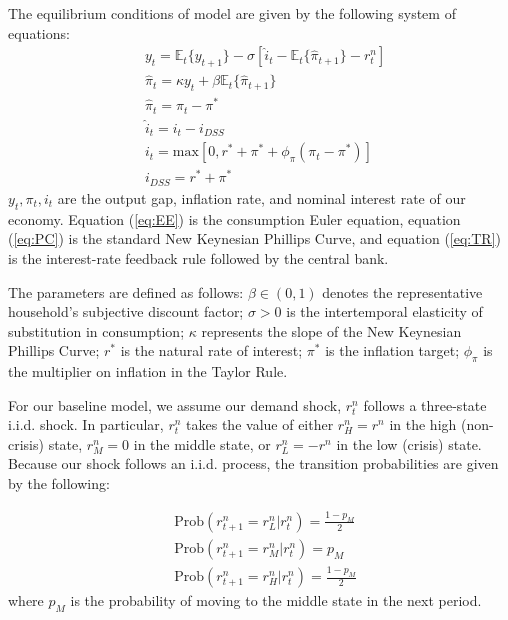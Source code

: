 \documentclass[11pt]{article}
\begin{document}
	The equilibrium conditions of model are given by the following system of equations: 
	\begin{align}
		& y_{t} = \mathbb{E}_t\{y_{t+1}\} - \sigma\left[\hat{i}_t - \mathbb{E}_t\{\hat{\pi}_{t+1}\}-r_t^n\right] \label{eq:EE}\\
		& \hat{\pi}_{t} = \kappa y_t + \beta\mathbb{E}_t\{\hat{\pi}_{t+1}\}\label{eq:PC}\\
		& \hat{\pi}_t = \pi_t - \pi^*\\
		& \hat{i}_t = i_t - i_{DSS} \\
		& i_t = \text{max}\left[0,r^* + \pi^* + \phi_{\pi}(\pi_t - \pi^*)\right]\label{eq:TR}\\
		& i_{DSS} = r^* + \pi^*
	\end{align}
	$y_t, \pi_t, i_t$ are the output gap, inflation rate, and nominal interest rate of our economy. Equation (\ref{eq:EE}) is the consumption Euler equation, equation (\ref{eq:PC}) is the standard New Keynesian Phillips Curve, and equation (\ref{eq:TR}) is the interest-rate feedback rule followed by the central bank. 
	
	The parameters are defined as follows: $\beta\in(0, 1)$ denotes the representative household's subjective discount factor; $\sigma>0$ is the intertemporal elasticity of substitution in consumption; $\kappa$ represents the slope of the New Keynesian Phillips Curve; $r^*$ is the natural rate of interest; $\pi^*$ is the inflation target; $\phi_{\pi}$ is the multiplier on inflation in the Taylor Rule. 
	
	For our baseline model, we assume our demand shock, $r_t^n$ follows a three-state i.i.d. shock. In particular, $r_t^n$ takes the value of either $r_H^n = r^n$ in the high (non-crisis) state, $r_M^n = 0$ in the middle state, or $r_L^n = -r^n$ in the low (crisis) state. Because our shock follows an i.i.d. process, the transition probabilities are given by the following: 
	
	\begin{align}
		& \text{Prob}\left(r_{t+1}^n = r_L^n | r_t^n \right) = \frac{1-p_M}{2}\\
		& \text{Prob}\left(r_{t+1}^n = r_M^n | r_t^n \right) = p_M\\
		& \text{Prob}\left(r_{t+1}^n = r_H^n | r_t^n \right) = \frac{1-p_M}{2}
	\end{align}
	\noindent
	where $p_M$ is the probability of moving to the middle state in the next period. 
	
\end{document}
